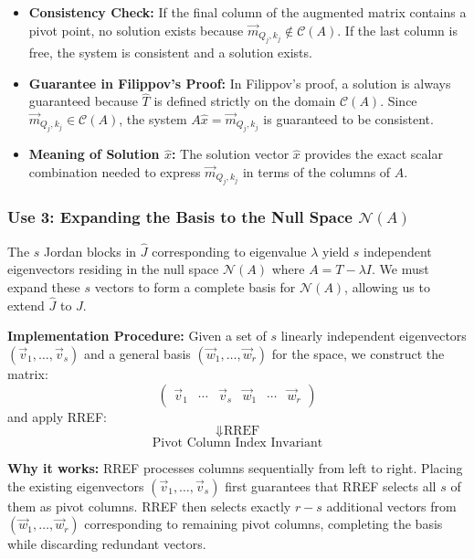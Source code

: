 \documentclass[12pt, a4paper]{article}
\begin{document}
\begin{itemize}
    \item \textbf{Consistency Check:} If the final column of the augmented matrix contains a pivot point, no solution exists because $\vec{m}_{Q_j, k_j} \notin \mathcal{C}(A)$. If the last column is free, the system is consistent and a solution exists.
    \item \textbf{Guarantee in Filippov's Proof:} In Filippov's proof, a solution is always guaranteed because $\hat{T}$ is defined strictly on the domain $\mathcal{C}(A)$. Since $\vec{m}_{Q_j, k_j} \in \mathcal{C}(A)$, the system $A\hat{x} = \vec{m}_{Q_j, k_j}$ is guaranteed to be consistent.
    \item \textbf{Meaning of Solution $\hat{x}$:} The solution vector $\hat{x}$ provides the exact scalar combination needed to express $\vec{m}_{Q_j, k_j}$ in terms of the columns of $A$.
\end{itemize}

\subsubsection*{Use 3: Expanding the Basis to the Null Space $\mathcal{N}(A)$}
The $s$ Jordan blocks in $\hat{J}$ corresponding to eigenvalue $\lambda$ yield $s$ independent eigenvectors residing in the null space $\mathcal{N}(A)$ where $A = T - \lambda I$. We must expand these $s$ vectors to form a complete basis for $\mathcal{N}(A)$, allowing us to extend $\hat{J}$ to $J$.

\textbf{Implementation Procedure:}
Given a set of $s$ linearly independent eigenvectors $(\vec{v}_1, \dots, \vec{v}_s)$ and a general basis $(\vec{w}_1, \dots, \vec{w}_r)$ for the space, we construct the matrix:
\[
\begin{pmatrix} \vec{v}_1 & \cdots & \vec{v}_s & \vec{w}_1 & \cdots & \vec{w}_r \end{pmatrix}
\]
and apply RREF:
\[
\Downarrow \text{RREF}
\]
\[
\text{Pivot Column Index Invariant}
\]

\textbf{Why it works:} RREF processes columns sequentially from left to right. Placing the existing eigenvectors $(\vec{v}_1, \dots, \vec{v}_s)$ first guarantees that RREF selects all $s$ of them as pivot columns. RREF then selects exactly $r - s$ additional vectors from $(\vec{w}_1, \dots, \vec{w}_r)$ corresponding to remaining pivot columns, completing the basis while discarding redundant vectors.
\end{document}
